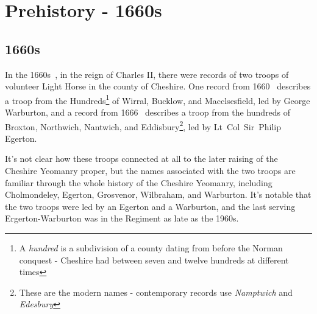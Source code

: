 \chapter{Prehistory - 1660s}

\begin{multicols}{2}
\small

\section*{1660s}

In the 1660s~\cite[p3]{leary}, in the reign of Charles II, there were records of two troops of volunteer Light Horse in the county of Cheshire. One record from 1660~\cite[p289]{leary} describes a troop from the Hundreds\footnote{A \emph{hundred} is a subdivision of a county dating from before the Norman conquest - Cheshire had between seven and twelve hundreds at different times} of Wirral, Bucklow, and Macclsesfield, led by George Warburton, and a record from 1666~\cite[p285]{leary} describes a troop from the hundreds of Broxton, Northwich, Nantwich, and Eddisbury\footnote{These are the modern names - contemporary records use \textit{Namptwich} and \textit{Edesbury}}, led by Lt~Col~Sir~Philip Egerton.

It's not clear how these troops connected at all to the later raising of the Cheshire Yeomanry proper, but the names associated with the two troops are familiar through the whole history of the Cheshire Yeomanry, including Cholmondeley, Egerton, Grosvenor, Wilbraham, and Warburton. It's notable that the two troops were led by an Egerton and a Warburton, and the last serving Ergerton-Warburton was in the Regiment as late as the 1960s.

\end{multicols}
